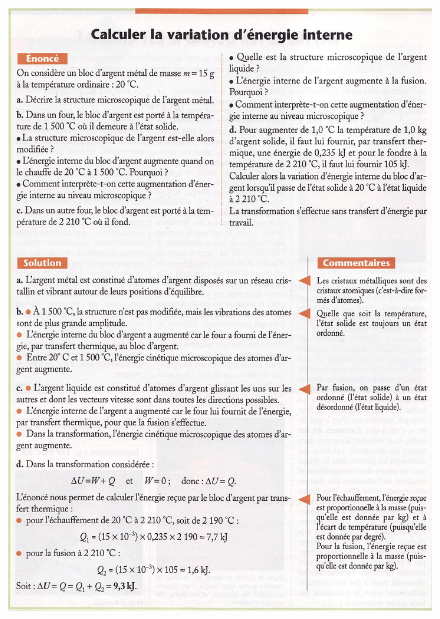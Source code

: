 \documentclass[11pt,a4paper]{article}
\begin{document}
\begin{figure}[h]
    \centering
    \includegraphics[width=\linewidth]{imgs/p4/xo2.jpg}
\end{figure}
\end{document}
